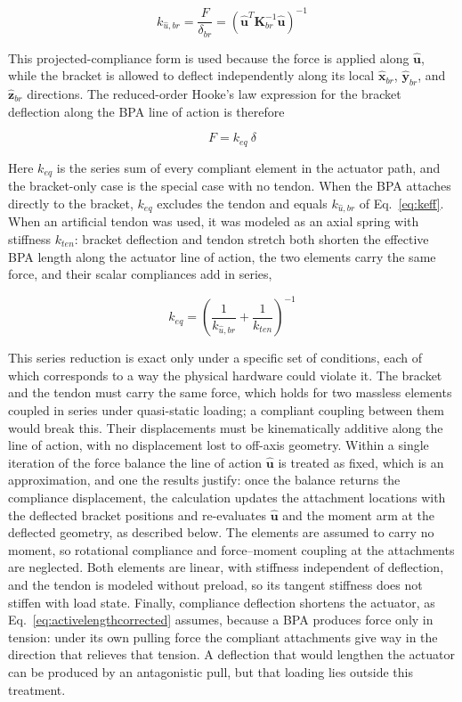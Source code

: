 \begin{equation}
k_{\hat{u},br} = \frac{F}{\delta_{br}} = \left( \hat{\mathbf{u}}^{T} \mathbf{K}_{br}^{-1} \hat{\mathbf{u}} \right)^{-1}
\label{eq:keff}
\end{equation}

This projected-compliance form is used because the force is applied along $\hat{\mathbf{u}}$, while the bracket is allowed to deflect independently along its local $\hat{\mathbf{x}}_{br}$, $\hat{\mathbf{y}}_{br}$, and $\hat{\mathbf{z}}_{br}$ directions. The reduced-order Hooke's law expression for the bracket deflection along the BPA line of action is therefore

\begin{equation} F = k_{eq} \: \delta
\label{eq:hookereduced}
\end{equation}

Here $k_{eq}$ is the series sum of every compliant element in the actuator path, and the bracket-only case is the special case with no tendon. When the BPA attaches directly to the bracket, $k_{eq}$ excludes the tendon and equals $k_{\hat{u},br}$ of Eq.~\eqref{eq:keff}. When an artificial tendon was used, it was modeled as an axial spring with stiffness $k_{ten}$: bracket deflection and tendon stretch both shorten the effective BPA length along the actuator line of action, the two elements carry the same force, and their scalar compliances add in series,

\begin{equation} k_{eq} = \left( \frac{1}{k_{\hat{u},br}} + \frac{1}{k_{ten}} \right)^{-1}
\label{eq:equivalentstiffness}
\end{equation}

This series reduction is exact only under a specific set of conditions, each of which corresponds to a way the physical hardware could violate it. The bracket and the tendon must carry the same force, which holds for two massless elements coupled in series under quasi-static loading; a compliant coupling between them would break this. Their displacements must be kinematically additive along the line of action, with no displacement lost to off-axis geometry. Within a single iteration of the force balance the line of action $\hat{\mathbf{u}}$ is treated as fixed, which is an approximation, and one the results justify: once the balance returns the compliance displacement, the calculation updates the attachment locations with the deflected bracket positions and re-evaluates $\hat{\mathbf{u}}$ and the moment arm at the deflected geometry, as described below. The elements are assumed to carry no moment, so rotational compliance and force--moment coupling at the attachments are neglected. Both elements are linear, with stiffness independent of deflection, and the tendon is modeled without preload, so its tangent stiffness does not stiffen with load state. Finally, compliance deflection shortens the actuator, as Eq.~\eqref{eq:activelengthcorrected} assumes, because a BPA produces force only in tension: under its own pulling force the compliant attachments give way in the direction that relieves that tension. A deflection that would lengthen the actuator can be produced by an antagonistic pull, but that loading lies outside this treatment.

